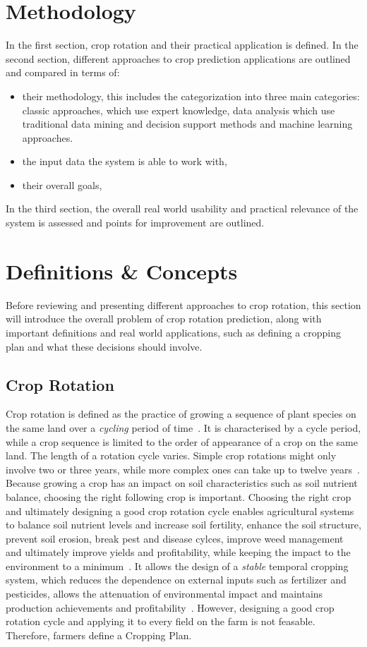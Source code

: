 \documentclass{Academic}
\begin{document}
    \section{Methodology}
    In the first section, crop rotation and their practical application is defined. In the second section, different approaches to crop prediction applications are outlined and compared in terms of:
    \begin{itemize}
        \item their methodology, this includes the categorization into three main categories: classic approaches, which use expert knowledge, data analysis which use traditional data mining and decision support methods and machine learning approaches.
        \item the input data the system is able to work with,
        \item their overall goals,
    \end{itemize}
    In the third section, the overall real world usability and practical relevance of the system is assessed and points for improvement are outlined.

    \section{Definitions \& Concepts}
    Before reviewing and presenting different approaches to crop rotation, this section will introduce the overall problem of crop rotation prediction, along with important definitions and real world applications, such as defining a cropping plan and what these decisions should involve.

    \subsection{Crop Rotation}
    Crop rotation is defined as the practice of growing a sequence of plant species on the same land over a \textit{cycling} period of time~\cite{noauthor_crop_2023, dury_models_2012}. It is characterised by a cycle period, while a crop sequence is limited to the order of appearance of a crop on the same land. The length of a rotation cycle varies. Simple crop rotations might only involve two or three years, while more complex ones can take up to twelve years~\cite{noauthor_crop_2023}. Because growing a crop has an impact on soil characteristics such as soil nutrient balance, choosing the right following crop is important. Choosing the right crop and ultimately designing a good crop rotation cycle enables agricultural systems to balance soil nutrient levels and increase soil fertility, enhance the soil structure, prevent soil erosion, break pest and disease cylces, improve weed management and ultimately improve yields and profitability, while keeping the impact to the environment to a minimum~\cite{noauthor_crop_2023}. It allows the design of a \textit{stable} temporal cropping system, which reduces the dependence on external inputs such as fertilizer and pesticides, allows the attenuation of environmental impact and maintains production achievements and profitability~\cite{dury_models_2012}. However, designing a good crop rotation cycle and applying it to every field on the farm is not feasable. Therefore, farmers define a Cropping Plan.
\end{document}
